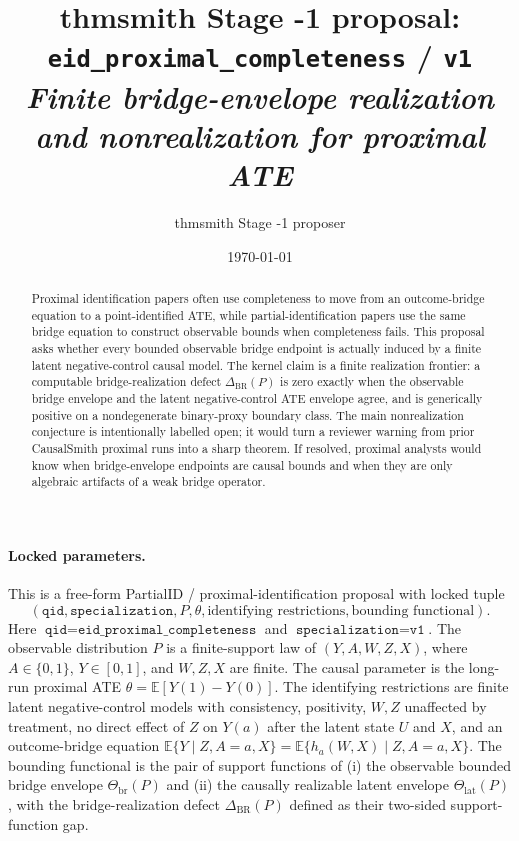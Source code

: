 \documentclass[11pt]{article}
\title{thmsmith Stage -1 proposal: \texttt{eid\_proximal\_completeness} / \texttt{v1}%
  \\ \large\textit{Finite bridge-envelope realization and nonrealization for proximal ATE}}
\author{thmsmith Stage -1 proposer}
\date{\today}
\newcommand{\E}{\mathbb{E}}
\theoremstyle{definition}
\theoremstyle{plain}
\theoremstyle{remark}
\begin{document}
\maketitle


\paragraph{Locked parameters.}
This is a free-form PartialID / proximal-identification proposal with locked tuple
\[
(\texttt{qid},\texttt{specialization},P,\theta,\text{identifying restrictions},\text{bounding functional}).
\]
Here \(\texttt{qid}=\texttt{eid\_proximal\_completeness}\) and
\(\texttt{specialization}=\texttt{v1}\).  The observable distribution \(P\) is
a finite-support law of \((Y,A,W,Z,X)\), where \(A\in\{0,1\}\), \(Y\in[0,1]\),
and \(W,Z,X\) are finite.  The causal parameter is the long-run proximal ATE
\(\theta=\E[Y(1)-Y(0)]\).  The identifying restrictions are finite latent
negative-control models with consistency, positivity, \(W,Z\) unaffected by
treatment, no direct effect of \(Z\) on \(Y(a)\) after the latent state
\(U\) and \(X\), and an outcome-bridge equation
\(\E\{Y\mid Z,A=a,X\}=\E\{h_a(W,X)\mid Z,A=a,X\}\).  The bounding functional is
the pair of support functions of (i) the observable bounded bridge envelope
\(\Theta_{\mathrm{br}}(P)\) and (ii) the causally realizable latent envelope
\(\Theta_{\mathrm{lat}}(P)\), with the bridge-realization defect
\(\Delta_{\mathrm{BR}}(P)\) defined as their two-sided support-function gap.

\begin{abstract}
Proximal identification papers often use completeness to move from an
outcome-bridge equation to a point-identified ATE, while partial-identification
papers use the same bridge equation to construct observable bounds when
completeness fails.  This proposal asks whether every bounded observable bridge
endpoint is actually induced by a finite latent negative-control causal model.
The kernel claim is a finite realization frontier: a computable
bridge-realization defect \(\Delta_{\mathrm{BR}}(P)\) is zero exactly when the
observable bridge envelope and the latent negative-control ATE envelope agree,
and is generically positive on a nondegenerate binary-proxy boundary class.  The
main nonrealization conjecture is intentionally labelled open; it would turn a
reviewer warning from prior CausalSmith proximal runs into a sharp theorem.
If resolved, proximal analysts would know when bridge-envelope endpoints are
causal bounds and when they are only algebraic artifacts of a weak bridge
operator.
\end{abstract}
\end{document}
